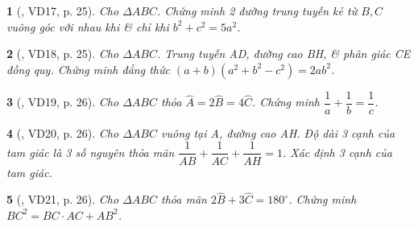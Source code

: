 \documentclass{article}
\newtheorem{baitoan}{}
\begin{document}
\begin{baitoan}[\cite{Kien_hinh_hoc_9}, VD17, p. 25]
	Cho $\Delta ABC$. Chứng minh 2 đường trung tuyến kẻ từ $B,C$ vuông góc với nhau khi \& chỉ khi $b^2 + c^2 = 5a^2$.	
\end{baitoan}

\begin{baitoan}[\cite{Kien_hinh_hoc_9}, VD18, p. 25]
	Cho $\Delta ABC$. Trung tuyến AD, đường cao BH, \& phân giác CE đồng quy. Chứng minh đẳng thức $(a + b)(a^2 + b^2 - c^2) = 2ab^2$.
\end{baitoan}

\begin{baitoan}[\cite{Kien_hinh_hoc_9}, VD19, p. 26]
	Cho $\Delta ABC$ thỏa $\widehat{A} = 2\widehat{B} = 4\widehat{C}$. Chứng minh $\dfrac{1}{a} + \dfrac{1}{b} = \dfrac{1}{c}$.
\end{baitoan}

\begin{baitoan}[\cite{Kien_hinh_hoc_9}, VD20, p. 26]
	Cho $\Delta ABC$ vuông tại A, đường cao AH. Độ dài 3 cạnh của tam giác là 3 số nguyên thỏa mãn $\dfrac{1}{AB} + \dfrac{1}{AC} + \dfrac{1}{AH} = 1$. Xác định 3 cạnh của tam giác.
\end{baitoan}

\begin{baitoan}[\cite{Kien_hinh_hoc_9}, VD21, p. 26]
	Cho $\Delta ABC$ thỏa mãn $2\widehat{B} + 3\widehat{C} = 180^\circ$. Chứng minh $BC^2 = BC\cdot AC + AB^2$.
\end{baitoan}


\printbibliography[heading=bibintoc]
\end{document}
